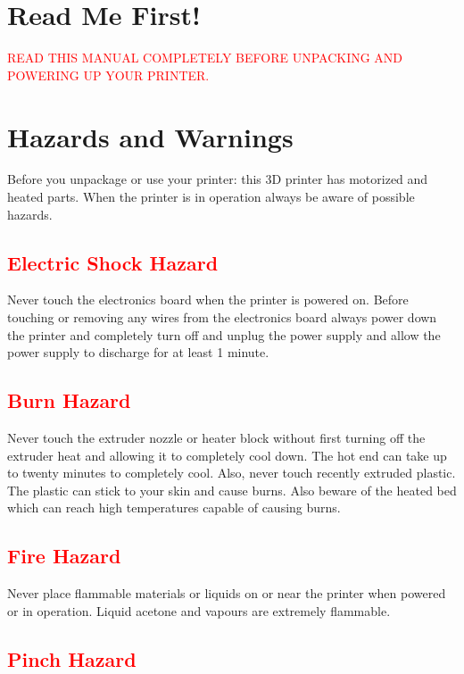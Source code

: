 \section{Read Me First!}
\textcolor{red}{READ THIS MANUAL COMPLETELY BEFORE UNPACKING AND POWERING UP YOUR PRINTER.}

\section{Hazards and Warnings}

Before you unpackage or use your printer: this 3D printer has motorized and heated parts. When the printer is in operation always be aware of possible hazards.

\subsection{\textcolor{red}{Electric Shock Hazard}}
Never touch the electronics board when the printer is powered on. Before touching or removing any wires from the electronics board always power down the printer and completely turn off and unplug the power supply and allow the power supply to discharge for at least 1 minute.

\subsection{\textcolor{red}{Burn Hazard}}
Never touch the extruder nozzle or heater block without first turning off the extruder heat and allowing it to completely cool down. The hot end can take up to twenty minutes to completely cool. Also, never touch recently extruded plastic. The plastic can stick to your skin and  cause burns. Also beware of the heated bed which can reach high temperatures capable of causing burns.

\subsection{\textcolor{red}{Fire Hazard}}
Never place flammable materials or liquids on or near the printer when powered or in operation. Liquid acetone and vapours are extremely flammable.

\subsection{\textcolor{red}{Pinch Hazard}}

